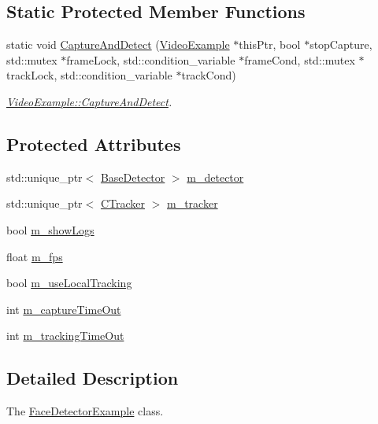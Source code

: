 \subsection*{Static Protected Member Functions}
\begin{DoxyCompactItemize}
\item 
static void \mbox{\hyperlink{class_video_example_ace8617201da40b6e230bd6c049b48aa0}{Capture\+And\+Detect}} (\mbox{\hyperlink{class_video_example}{Video\+Example}} $\ast$this\+Ptr, bool $\ast$stop\+Capture, std\+::mutex $\ast$frame\+Lock, std\+::condition\+\_\+variable $\ast$frame\+Cond, std\+::mutex $\ast$track\+Lock, std\+::condition\+\_\+variable $\ast$track\+Cond)
\begin{DoxyCompactList}\small\item\em \mbox{\hyperlink{class_video_example_ace8617201da40b6e230bd6c049b48aa0}{Video\+Example\+::\+Capture\+And\+Detect}}. \end{DoxyCompactList}\end{DoxyCompactItemize}
\subsection*{Protected Attributes}
\begin{DoxyCompactItemize}
\item 
std\+::unique\+\_\+ptr$<$ \mbox{\hyperlink{class_base_detector}{Base\+Detector}} $>$ \mbox{\hyperlink{class_video_example_a00fee4b18b68d605b87051f3bdaa1c92}{m\+\_\+detector}}
\item 
std\+::unique\+\_\+ptr$<$ \mbox{\hyperlink{class_c_tracker}{C\+Tracker}} $>$ \mbox{\hyperlink{class_video_example_a7c58cd8c883981b2e645d1a3d8edf76a}{m\+\_\+tracker}}
\item 
bool \mbox{\hyperlink{class_video_example_af3bfe51e3e1452bb084016602c668463}{m\+\_\+show\+Logs}}
\item 
float \mbox{\hyperlink{class_video_example_ae8110012f8d57f39d6355377cf20fb27}{m\+\_\+fps}}
\item 
bool \mbox{\hyperlink{class_video_example_a951ee017c4fbb180dfc965a9a35ac69f}{m\+\_\+use\+Local\+Tracking}}
\item 
int \mbox{\hyperlink{class_video_example_aea3c9dd66a3464fab8c61a838aff0ccf}{m\+\_\+capture\+Time\+Out}}
\item 
int \mbox{\hyperlink{class_video_example_a47c8dd1d6ec7e8e18a8f7d92536c53a2}{m\+\_\+tracking\+Time\+Out}}
\end{DoxyCompactItemize}


\subsection{Detailed Description}
The \mbox{\hyperlink{class_face_detector_example}{Face\+Detector\+Example}} class. 

